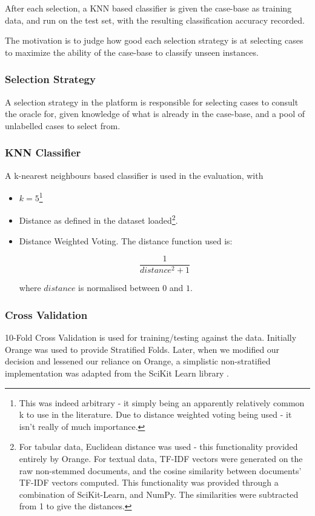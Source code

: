 \documentclass[a4paper,11pt]{report}
\begin{document}
After each selection, a KNN based classifier is given the case-base as training data, and run on the test set, with the resulting classification accuracy recorded.

The motivation is to judge how good each selection strategy is at selecting cases to maximize the ability of the case-base to classify unseen instances.

\subsubsection{Selection Strategy}

A selection strategy in the platform is responsible for selecting cases to consult the oracle for, given knowledge of what is already in the case-base, and a pool of unlabelled cases to select from.

\subsubsection{KNN Classifier}
A k-nearest neighbours based classifier is used in the evaluation, with 
\begin{itemize}
	\item $k=5$\footnote{This was indeed arbitrary - it simply being an apparently relatively common k to use in the literature. Due to distance weighted voting being used - it isn't really of much importance.} 
	\item Distance as defined in the dataset loaded\footnote {For tabular data, Euclidean distance was used - this functionality provided entirely by Orange. For textual data, TF-IDF vectors were generated on the raw non-stemmed documents, and the cosine similarity between documents' TF-IDF vectors computed. This functionality was provided through a combination of SciKit-Learn, and NumPy. The similarities were subtracted from 1 to give the distances. }.
	\item Distance Weighted Voting. The distance function used is:
	
	\[
	\frac{1}{distance^{2}+1}
	\]
	
	where $distance$ is normalised between $0$ and $1$.
	
	
\end{itemize}

\subsubsection{Cross Validation}

10-Fold Cross Validation is used for training/testing against the data. Initially Orange was used to provide Stratified Folds. Later, when we modified our decision and lessened our reliance on Orange, a simplistic non-stratified implementation was adapted from the SciKit Learn library \citep{prog:sklearn}.
\end{document}
